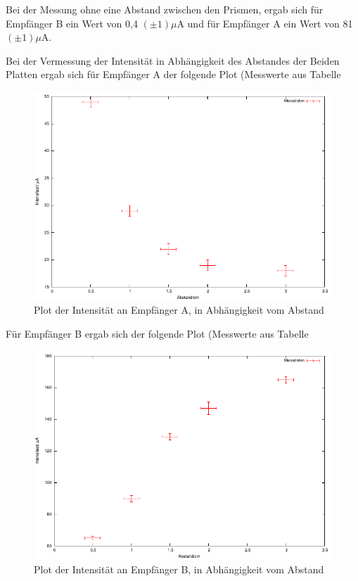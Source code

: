 \documentclass[12pt]{scrartcl}
\begin{document}
Bei der Messung ohne eine Abstand zwischen den Prismen, ergab sich für Empfänger B ein Wert von 0,4 $(\pm 1) \mu$A und für Empfänger A ein Wert von 81 $(\pm 1) \mu$A.

Bei der Vermessung der Intensität in Abhängigkeit des Abstandes der Beiden Platten ergab sich für Empfänger A der folgende Plot (Messwerte aus Tabelle 

\begin{figure}[H]
\centering
    \includegraphics[scale = 1]{a_3_A.pdf}
  	\caption[Plot der Intensität an Empfänger A, in Abhängigkeit vom Abstand]{Plot der Intensität an Empfänger A, in Abhängigkeit vom Abstand}
  \label{fig:a_3_A}
\end{figure}

Für Empfänger B ergab sich der folgende Plot (Messwerte aus Tabelle %

\begin{figure}[H]
\centering
    \includegraphics[scale = 1]{a_3_B.pdf}
  	\caption[Plot der Intensität an Empfänger B, in Abhängigkeit vom Abstand]{Plot der Intensität an Empfänger B, in Abhängigkeit vom Abstand}
  \label{fig:a_3_B}
\end{figure}
\end{document}
